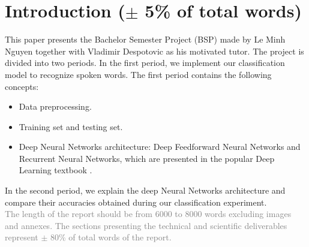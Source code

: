 \section{Introduction ($\pm$ 5\% of total words)}

This paper presents the Bachelor Semester Project (BSP) made by Le Minh Nguyen
together with Vladimir Despotovic as his motivated tutor. The project is divided
into two periods. In the first period, we implement our classification model to
recognize spoken words. The first period contains the following concepts:\\

\begin{itemize}
\item Data preprocessing.
\item Training set and testing set.
\item Deep Neural Networks architecture: Deep Feedforward Neural Networks and
  Recurrent Neural Networks, which are presented in the popular Deep Learning textbook
  \cite{Goodfellow-et-al-2016}.
\end{itemize}

In the second period, we explain the deep Neural Networks architecture and compare their
accuracies obtained during our classification experiment.\\

\textcolor{gray}{The length of the report should be from 6000 to 8000 words
  excluding images and annexes. The sections presenting the technical and
  scientific deliverables represent $\pm$ 80\% of total words of the report.}
